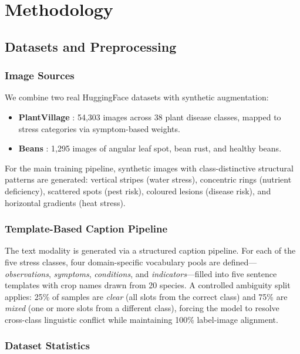 \documentclass[12pt, a4paper, oneside]{Thesis}
\begin{document}
\chapter{Methodology}
\label{Chapter3}

\section{Datasets and Preprocessing}

\subsection{Image Sources}
We combine two real HuggingFace datasets with synthetic augmentation:
\begin{itemize}[leftmargin=1.2em]
  \item \textbf{PlantVillage} \cite{Mohanty2016}: 54,303 images across 38 plant disease classes, mapped to stress categories via symptom-based weights.
  \item \textbf{Beans} \cite{Beans2020}: 1,295 images of angular leaf spot, bean rust, and healthy beans.
\end{itemize}
For the main training pipeline, synthetic images with class-distinctive structural patterns are generated: vertical stripes (water stress), concentric rings (nutrient deficiency), scattered spots (pest risk), coloured lesions (disease risk), and horizontal gradients (heat stress).

\subsection{Template-Based Caption Pipeline}
The text modality is generated via a structured caption pipeline. For each of the five stress classes, four domain-specific vocabulary pools are defined---\emph{observations}, \emph{symptoms}, \emph{conditions}, and \emph{indicators}---filled into five sentence templates with crop names drawn from 20 species. A controlled ambiguity split applies: 25\% of samples are \emph{clear} (all slots from the correct class) and 75\% are \emph{mixed} (one or more slots from a different class), forcing the model to resolve cross-class linguistic conflict while maintaining 100\% label-image alignment.

\subsection{Dataset Statistics}
\end{document}
